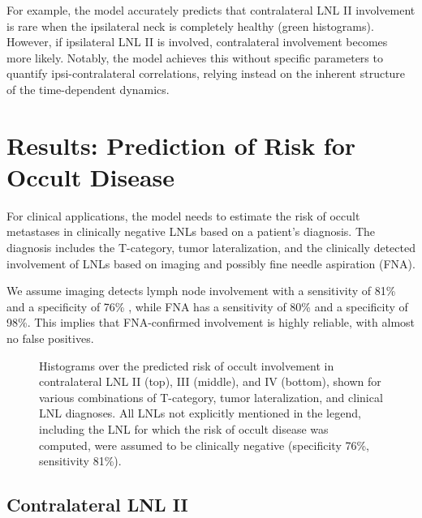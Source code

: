\documentclass[
  sn-mathphys-num,
]{sn-jnl}
\begin{document}
For example, the model accurately predicts that contralateral LNL II
involvement is rare when the ipsilateral neck is completely healthy
(green histograms). However, if ipsilateral LNL II is involved,
contralateral involvement becomes more likely. Notably, the model
achieves this without specific parameters to quantify ipsi-contralateral
correlations, relying instead on the inherent structure of the
time-dependent dynamics.

\section{Results: Prediction of Risk for Occult
Disease}\label{sec-results-risk}

For clinical applications, the model needs to estimate the risk of
occult metastases in clinically negative LNLs based on a patient's
diagnosis. The diagnosis includes the T-category, tumor lateralization,
and the clinically detected involvement of LNLs based on imaging and
possibly fine needle aspiration (FNA).

We assume imaging detects lymph node involvement with a sensitivity of
81\% and a specificity of 76\% \citep{debondt_detection_2007}, while FNA
has a sensitivity of 80\% and a specificity of 98\%. This implies that
FNA-confirmed involvement is highly reliable, with almost no false
positives.

\begin{figure}


\caption{\label{fig-model-risks}Histograms over the predicted risk of
occult involvement in contralateral LNL II (top), III (middle), and IV
(bottom), shown for various combinations of T-category, tumor
lateralization, and clinical LNL diagnoses. All LNLs not explicitly
mentioned in the legend, including the LNL for which the risk of occult
disease was computed, were assumed to be clinically negative
(specificity 76\%, sensitivity 81\%).}

\end{figure}%

\subsection{Contralateral LNL II}\label{contralateral-lnl-ii}
\end{document}
